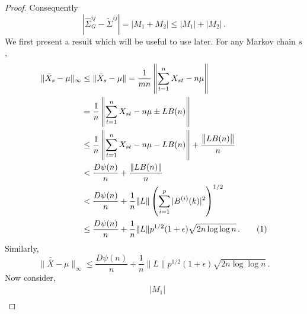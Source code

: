 \documentclass[11pt]{article}
\newcommand\numberthis{\addtocounter{equation}{1}\tag{\theequation}}
\theoremstyle{remark}
\begin{document}
\begin{proof}
Consequently
\[
\left|\hat{\Sigma}_{G}^{ij} - \tilde{\Sigma}^{ij}  \right| = |M_1 + M_2| \leq |M_1| + |M_2|\,.
\]
%
We first present a result which will be useful to use later. For any Markov chain $s$, 
\begin{align*}
  \|\bar{X}_s - \mu\|_{\infty} & \leq \|\bar{X}_s - \mu\| = \dfrac{1}{mn}\left\|\sum_{t=1}^{n}X_{st} - n\mu\right\| \\
  &= \dfrac{1}{n}  \left \|\sum_{t=1}^{n}X_{st} - n\mu \pm L B(n) \right\|\\
  & \leq \dfrac{1}{n}\left\|\sum_{t=1}^{n}X_{st} - n \mu - L B(n)\right\| + \dfrac{\left\|L B(n)\right\|}{n}\\
  &< \dfrac{D\psi(n)}{n} + \dfrac{\|L B(n)\|}{n}\\
  &< \dfrac{D\psi(n)}{n} + \dfrac{1}{n}\|L\| \left(\sum\limits_{i=1}^{p}|B^{(i)}(k)|^2\right)^{1/2}\\
  & \leq \dfrac{D\psi(n)}{n} + \dfrac{1}{n}\|L\| p^{1/2}(1+\epsilon)\sqrt{2n \log\log n}\,. \numberthis \label{eq:xbars_bound}
\end{align*}
 Similarly,
 \begin{equation}
\label{eq:xbarbar_bound}
   \| \bar{\bar{X}} - \mu\|_{\infty} \leq \dfrac{D\psi(n)}{n} + \dfrac{1}{n}\|L\| p^{1/2}(1+\epsilon)\sqrt{2n \log\log n}\,.
\end{equation}
%
Now consider,
\begin{align*}
& |M_1| \\ 

\end{align*}
\end{proof}
\end{document}
